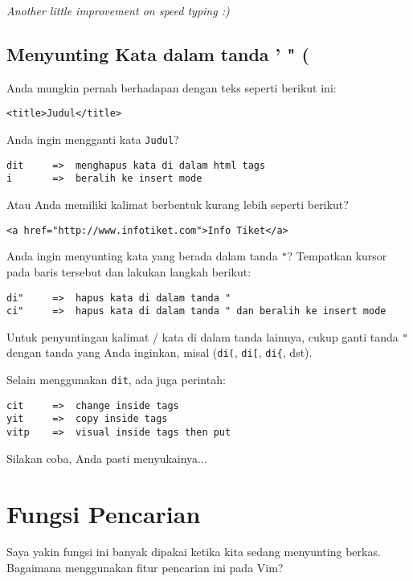 \documentclass{article}
\begin{document}
\emph{Another little improvement on speed typing :)}

\subsection{Menyunting Kata dalam tanda ' " (}
Anda mungkin pernah berhadapan dengan teks seperti berikut
ini:

\begin{verbatim}
<title>Judul</title>
\end{verbatim}

Anda ingin mengganti kata \verb=Judul=?

\begin{verbatim}
dit     =>  menghapus kata di dalam html tags
i       =>  beralih ke insert mode
\end{verbatim}

Atau Anda memiliki kalimat berbentuk kurang lebih seperti
berikut?

\begin{verbatim}
<a href="http://www.infotiket.com">Info Tiket</a>
\end{verbatim}

Anda ingin menyunting kata yang berada dalam tanda \verb="=?
Tempatkan kursor pada baris tersebut dan lakukan langkah
berikut:

\begin{verbatim}
di"     =>  hapus kata di dalam tanda "
ci"     =>  hapus kata di dalam tanda " dan beralih ke insert mode
\end{verbatim}

Untuk penyuntingan kalimat / kata di dalam tanda lainnya,
cukup ganti tanda \verb="= dengan tanda yang Anda inginkan,
misal (\verb=di(=, \verb=di[=, \verb=di{=, dst).

Selain menggunakan \verb=dit=, ada juga perintah:

\begin{verbatim}
cit     =>  change inside tags
yit     =>  copy inside tags
vitp    =>  visual inside tags then put
\end{verbatim}

Silakan coba, Anda pasti menyukainya...

\section{Fungsi Pencarian}

Saya yakin fungsi ini banyak dipakai ketika kita sedang
menyunting berkas. Bagaimana menggunakan fitur pencarian ini
pada Vim?
\end{document}
